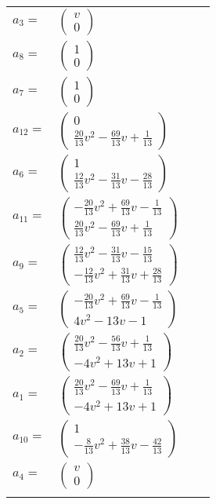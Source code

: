\documentclass[1p]{elsarticle_modified}
\theoremstyle{definition}
\begin{document}
\begin{tabular}{m{7pt} m{180pt} m{7pt} m{180pt} }
\flushright $a_{3}=$&$\begin{pmatrix}v\\0\end{pmatrix}$ \\
\flushright $a_{8}=$&$\begin{pmatrix}1\\0\end{pmatrix}$ \\
\flushright $a_{7}=$&$\begin{pmatrix}1\\0\end{pmatrix}$ \\
\flushright $a_{12}=$&$\begin{pmatrix}0\\\frac{20}{13} v^2-\frac{69}{13} v+\frac{1}{13}\end{pmatrix}$ \\
\flushright $a_{6}=$&$\begin{pmatrix}1\\\frac{12}{13} v^2-\frac{31}{13} v-\frac{28}{13}\end{pmatrix}$ \\
\flushright $a_{11}=$&$\begin{pmatrix}-\frac{20}{13} v^2+\frac{69}{13} v-\frac{1}{13}\\\frac{20}{13} v^2-\frac{69}{13} v+\frac{1}{13}\end{pmatrix}$ \\
\flushright $a_{9}=$&$\begin{pmatrix}\frac{12}{13} v^2-\frac{31}{13} v-\frac{15}{13}\\-\frac{12}{13} v^2+\frac{31}{13} v+\frac{28}{13}\end{pmatrix}$ \\
\flushright $a_{5}=$&$\begin{pmatrix}-\frac{20}{13} v^2+\frac{69}{13} v-\frac{1}{13}\\4 v^2-13 v-1\end{pmatrix}$ \\
\flushright $a_{2}=$&$\begin{pmatrix}\frac{20}{13} v^2-\frac{56}{13} v+\frac{1}{13}\\-4 v^2+13 v+1\end{pmatrix}$ \\
\flushright $a_{1}=$&$\begin{pmatrix}\frac{20}{13} v^2-\frac{69}{13} v+\frac{1}{13}\\-4 v^2+13 v+1\end{pmatrix}$ \\
\flushright $a_{10}=$&$\begin{pmatrix}1\\-\frac{8}{13} v^2+\frac{38}{13} v-\frac{42}{13}\end{pmatrix}$ \\
\flushright $a_{4}=$&$\begin{pmatrix}v\\0\end{pmatrix}$\\&\end{tabular}
\end{document}
